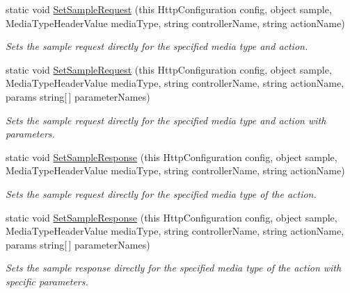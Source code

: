 \begin{DoxyCompactItemize}
static void \hyperlink{classApi3Layers_1_1Areas_1_1HelpPage_1_1HelpPageConfigurationExtensions_a82bd1788448158adaca5a19be618f630}{Set\+Sample\+Request} (this Http\+Configuration config, object sample, Media\+Type\+Header\+Value media\+Type, string controller\+Name, string action\+Name)
\begin{DoxyCompactList}\small\item\em Sets the sample request directly for the specified media type and action. \end{DoxyCompactList}\item 
static void \hyperlink{classApi3Layers_1_1Areas_1_1HelpPage_1_1HelpPageConfigurationExtensions_a1974e4f7b6984e2dbd16badf7700a505}{Set\+Sample\+Request} (this Http\+Configuration config, object sample, Media\+Type\+Header\+Value media\+Type, string controller\+Name, string action\+Name, params string\mbox{[}$\,$\mbox{]} parameter\+Names)
\begin{DoxyCompactList}\small\item\em Sets the sample request directly for the specified media type and action with parameters. \end{DoxyCompactList}\item 
static void \hyperlink{classApi3Layers_1_1Areas_1_1HelpPage_1_1HelpPageConfigurationExtensions_a51e9644a90326e7a1927c78a8d1e346b}{Set\+Sample\+Response} (this Http\+Configuration config, object sample, Media\+Type\+Header\+Value media\+Type, string controller\+Name, string action\+Name)
\begin{DoxyCompactList}\small\item\em Sets the sample request directly for the specified media type of the action. \end{DoxyCompactList}\item 
static void \hyperlink{classApi3Layers_1_1Areas_1_1HelpPage_1_1HelpPageConfigurationExtensions_a5a807eb4c15e3e12fc45ccaca4c87603}{Set\+Sample\+Response} (this Http\+Configuration config, object sample, Media\+Type\+Header\+Value media\+Type, string controller\+Name, string action\+Name, params string\mbox{[}$\,$\mbox{]} parameter\+Names)
\begin{DoxyCompactList}\small\item\em Sets the sample response directly for the specified media type of the action with specific parameters. \end{DoxyCompactList}\end{DoxyCompactItemize}
